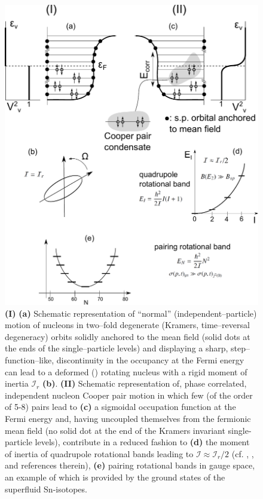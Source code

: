 
\begin{figure}
\centerline{\includegraphics*[width=\textwidth,angle=0]{nutshell/figs/fig1A3.pdf}}
\caption{\textbf{(I)} \textbf{(a)} Schematic representation of ``normal'' (independent--particle) motion of nucleons in  two--fold degenerate (Kramers, time--reversal degeneracy) orbits solidly anchored to the mean field (solid dots at the ends of the single--particle levels) and  displaying a sharp, step--function--like, discontinuity in the occupancy at the Fermi energy can lead to a deformed  (\cite{Nilsson:55}) rotating nucleus with a rigid moment of inertia $\mathcal{I}_r$ \textbf{(b)}. \textbf{(II)} Schematic representation of, phase correlated, independent nucleon Cooper pair  motion in which few (of the order of 5-8) pairs lead to \textbf{(c)} a sigmoidal occupation function at the Fermi energy and, having uncoupled themselves from the fermionic mean field (no solid dot at the end of the Kramers invariant single-particle levels),    contribute in a reduced fashion to \textbf{(d)} the moment of inertia of quadrupole rotational bands leading to $\mathcal{I}\approx\mathcal{I}_r/2$ (cf. \cite{Belyaev:13}, \cite{Belyaev:59}, \cite{Bohr:75} and references therein), \textbf{(e)} pairing rotational bands in gauge space, an example of which is  provided by the ground states of the superfluid Sn-isotopes.}\label{fig1A3}
\end{figure}
